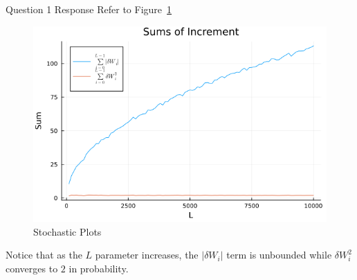 \documentclass[compress,12pt]{beamer}
\begin{document}
\begin{frame}{Question 1 Response}
      Refer to Figure~\ref{fig:convergence1}

      \begin{figure}[H]
      \centering
      \includegraphics[scale=0.32]{imgs/convergence1.png}
      \caption{Stochastic Plots}
      \label{fig:convergence1}
      \end{figure}

Notice that as the $L$ parameter increases, the $|\delta W_i|$ term is unbounded while $\delta W_i^2$ converges to $2$ in probability.
\end{frame}


\end{document}
